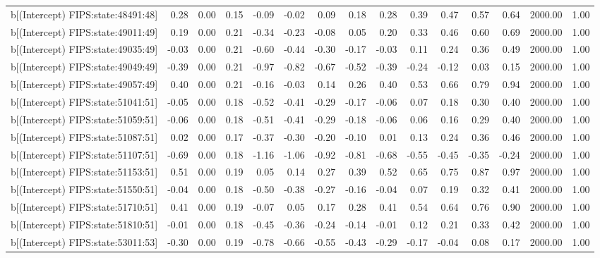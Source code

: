 \begin{table}[ht]
\begin{tabular}{rrrrrrrrrrrrrrr}
  b[(Intercept) FIPS:state:48491:48] & 0.28 & 0.00 & 0.15 & -0.09 & -0.02 & 0.09 & 0.18 & 0.28 & 0.39 & 0.47 & 0.57 & 0.64 & 2000.00 & 1.00 \\ 
  b[(Intercept) FIPS:state:49011:49] & 0.19 & 0.00 & 0.21 & -0.34 & -0.23 & -0.08 & 0.05 & 0.20 & 0.33 & 0.46 & 0.60 & 0.69 & 2000.00 & 1.00 \\ 
  b[(Intercept) FIPS:state:49035:49] & -0.03 & 0.00 & 0.21 & -0.60 & -0.44 & -0.30 & -0.17 & -0.03 & 0.11 & 0.24 & 0.36 & 0.49 & 2000.00 & 1.00 \\ 
  b[(Intercept) FIPS:state:49049:49] & -0.39 & 0.00 & 0.21 & -0.97 & -0.82 & -0.67 & -0.52 & -0.39 & -0.24 & -0.12 & 0.03 & 0.15 & 2000.00 & 1.00 \\ 
  b[(Intercept) FIPS:state:49057:49] & 0.40 & 0.00 & 0.21 & -0.16 & -0.03 & 0.14 & 0.26 & 0.40 & 0.53 & 0.66 & 0.79 & 0.94 & 2000.00 & 1.00 \\ 
  b[(Intercept) FIPS:state:51041:51] & -0.05 & 0.00 & 0.18 & -0.52 & -0.41 & -0.29 & -0.17 & -0.06 & 0.07 & 0.18 & 0.30 & 0.40 & 2000.00 & 1.00 \\ 
  b[(Intercept) FIPS:state:51059:51] & -0.06 & 0.00 & 0.18 & -0.51 & -0.41 & -0.29 & -0.18 & -0.06 & 0.06 & 0.16 & 0.29 & 0.40 & 2000.00 & 1.00 \\ 
  b[(Intercept) FIPS:state:51087:51] & 0.02 & 0.00 & 0.17 & -0.37 & -0.30 & -0.20 & -0.10 & 0.01 & 0.13 & 0.24 & 0.36 & 0.46 & 2000.00 & 1.00 \\ 
  b[(Intercept) FIPS:state:51107:51] & -0.69 & 0.00 & 0.18 & -1.16 & -1.06 & -0.92 & -0.81 & -0.68 & -0.55 & -0.45 & -0.35 & -0.24 & 2000.00 & 1.00 \\ 
  b[(Intercept) FIPS:state:51153:51] & 0.51 & 0.00 & 0.19 & 0.05 & 0.14 & 0.27 & 0.39 & 0.52 & 0.65 & 0.75 & 0.87 & 0.97 & 2000.00 & 1.00 \\ 
  b[(Intercept) FIPS:state:51550:51] & -0.04 & 0.00 & 0.18 & -0.50 & -0.38 & -0.27 & -0.16 & -0.04 & 0.07 & 0.19 & 0.32 & 0.41 & 2000.00 & 1.00 \\ 
  b[(Intercept) FIPS:state:51710:51] & 0.41 & 0.00 & 0.19 & -0.07 & 0.05 & 0.17 & 0.28 & 0.41 & 0.54 & 0.64 & 0.76 & 0.90 & 2000.00 & 1.00 \\ 
  b[(Intercept) FIPS:state:51810:51] & -0.01 & 0.00 & 0.18 & -0.45 & -0.36 & -0.24 & -0.14 & -0.01 & 0.12 & 0.21 & 0.33 & 0.42 & 2000.00 & 1.00 \\ 
  b[(Intercept) FIPS:state:53011:53] & -0.30 & 0.00 & 0.19 & -0.78 & -0.66 & -0.55 & -0.43 & -0.29 & -0.17 & -0.04 & 0.08 & 0.17 & 2000.00 & 1.00 \\ 

\end{tabular}
\end{table}
